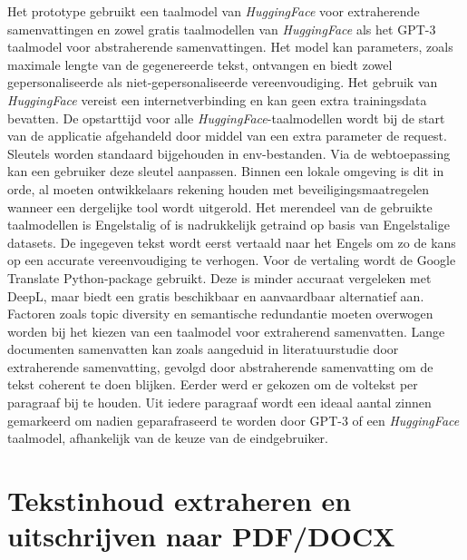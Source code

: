 Het prototype gebruikt een taalmodel van \textit{HuggingFace} voor extraherende samenvattingen en zowel gratis taalmodellen van \textit{HuggingFace} als het GPT-3 taalmodel voor abstraherende samenvattingen. Het model kan parameters, zoals maximale lengte van de gegenereerde tekst, ontvangen en biedt zowel gepersonaliseerde als niet-gepersonaliseerde vereenvoudiging. Het gebruik van \textit{HuggingFace} vereist een internetverbinding en kan geen extra trainingsdata bevatten. De opstarttijd voor alle \textit{HuggingFace}-taalmodellen wordt bij de start van de applicatie afgehandeld door middel van een extra parameter de request. Sleutels worden standaard bijgehouden in env-bestanden. Via de webtoepassing kan een gebruiker deze sleutel aanpassen. Binnen een lokale omgeving is dit in orde, al moeten ontwikkelaars rekening houden met beveiligingsmaatregelen wanneer een dergelijke tool wordt uitgerold. Het merendeel van de gebruikte taalmodellen is Engelstalig of is nadrukkelijk getraind op basis van Engelstalige datasets. De ingegeven tekst wordt eerst vertaald naar het Engels om zo de kans op een accurate vereenvoudiging te verhogen. Voor de vertaling wordt de Google Translate Python-package gebruikt. Deze is minder accuraat vergeleken met DeepL, maar biedt een gratis beschikbaar en aanvaardbaar alternatief aan. Factoren zoals topic diversity en semantische redundantie moeten overwogen worden bij het kiezen van een taalmodel voor extraherend samenvatten. Lange documenten samenvatten kan zoals aangeduid in literatuurstudie door extraherende samenvatting, gevolgd door abstraherende samenvatting om de tekst coherent te doen blijken. Eerder werd er gekozen om de voltekst per paragraaf bij te houden. Uit iedere paragraaf wordt een ideaal aantal zinnen gemarkeerd om nadien geparafraseerd te worden door GPT-3 of een \textit{HuggingFace} taalmodel, afhankelijk van de keuze van de eindgebruiker.


\section{Tekstinhoud extraheren en uitschrijven naar PDF/DOCX}

